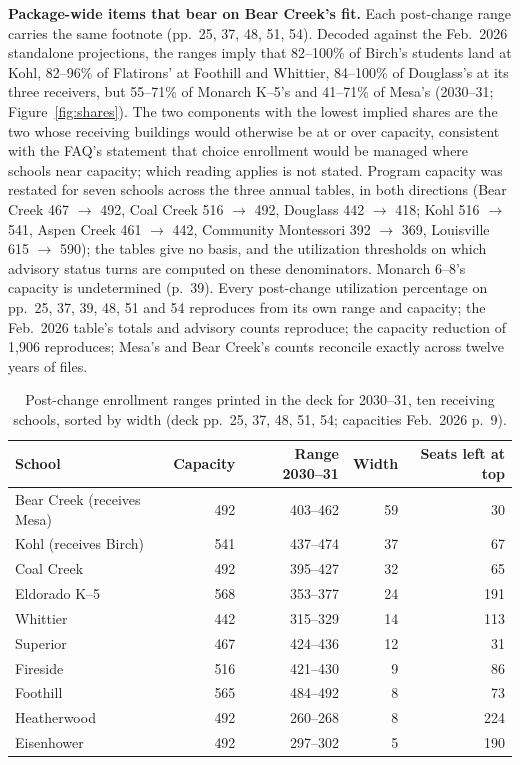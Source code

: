 \documentclass[11pt]{article}
\begin{document}
\noindent\textbf{Package-wide items that bear on Bear Creek's fit.} Each post-change range carries the same footnote (pp.\ 25, 37, 48, 51, 54). Decoded against the Feb.\ 2026 standalone projections, the ranges imply that 82--100\% of Birch's students land at Kohl, 82--96\% of Flatirons' at Foothill and Whittier, 84--100\% of Douglass's at its three receivers, but 55--71\% of Monarch K--5's and 41--71\% of Mesa's (2030--31; Figure~\ref{fig:shares}). The two components with the lowest implied shares are the two whose receiving buildings would otherwise be at or over capacity, consistent with the FAQ's statement that choice enrollment would be managed where schools near capacity; which reading applies is not stated. Program capacity was restated for seven schools across the three annual tables, in both directions (Bear Creek 467 $\to$ 492, Coal Creek 516 $\to$ 492, Douglass 442 $\to$ 418; Kohl 516 $\to$ 541, Aspen Creek 461 $\to$ 442, Community Montessori 392 $\to$ 369, Louisville 615 $\to$ 590); the tables give no basis, and the utilization thresholds on which advisory status turns are computed on these denominators. Monarch 6--8's capacity is undetermined (p.\ 39). Every post-change utilization percentage on pp.\ 25, 37, 39, 48, 51 and 54 reproduces from its own range and capacity; the Feb.\ 2026 table's totals and advisory counts reproduce; the capacity reduction of 1,906 reproduces; Mesa's and Bear Creek's counts reconcile exactly across twelve years of files.

\begin{table}[htbp]\centering\small
\caption{Post-change enrollment ranges printed in the deck for 2030--31, ten receiving schools, sorted by width (deck pp.\ 25, 37, 48, 51, 54; capacities Feb.\ 2026 p.\ 9).}\label{tab:widths}
\begin{tabular}{lrrrr}
\toprule
School & Capacity & Range 2030--31 & Width & Seats left at top \\
\midrule
Bear Creek (receives Mesa) & 492 & 403--462 & 59 & 30 \\
Kohl (receives Birch) & 541 & 437--474 & 37 & 67 \\
Coal Creek & 492 & 395--427 & 32 & 65 \\
Eldorado K--5 & 568 & 353--377 & 24 & 191 \\
Whittier & 442 & 315--329 & 14 & 113 \\
Superior & 467 & 424--436 & 12 & 31 \\
Fireside & 516 & 421--430 & 9 & 86 \\
Foothill & 565 & 484--492 & 8 & 73 \\
Heatherwood & 492 & 260--268 & 8 & 224 \\
Eisenhower & 492 & 297--302 & 5 & 190 \\
\bottomrule
\end{tabular}
\end{table}
\end{document}
